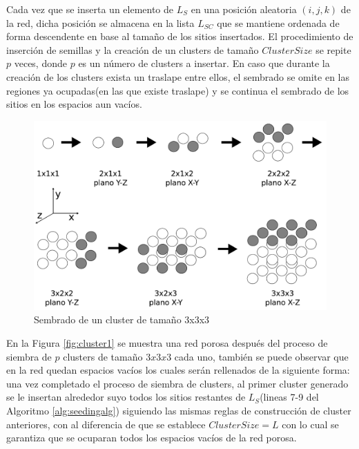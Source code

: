 Cada vez que se inserta un elemento de $L_S$ en una posición aleatoria $(i,j,k)$ de la red, dicha posición se almacena en la lista $L_{SC}$ que se mantiene ordenada de forma descendente en base al tamaño de los sitios insertados. El procedimiento de inserción de semillas y la creación de un clusters de tamaño $ClusterSize$ se repite $p$ veces, donde $p$ es un número de clusters a insertar. En caso que durante la creación de los clusters exista un traslape entre ellos, el sembrado se omite en las regiones ya ocupadas(en las que existe traslape) y se continua el sembrado de los sitios en los espacios aun vacíos.\\

\begin{figure}[hbtp]
\centering
\includegraphics[width=5.0in]{img/cluster_es.pdf}
\caption{Sembrado de un cluster de tamaño 3x3x3}
\label{fig:cluster}
\end{figure}

En la Figura \ref{fig:cluster1} se muestra una red porosa después del proceso de siembra de $p$ clusters de tamaño $3x3x3$ cada uno, también se puede observar que en la red quedan espacios vacíos  los cuales serán rellenados de la siguiente forma: una vez completado el proceso de siembra de clusters, al primer cluster generado se le insertan alrededor suyo todos los sitios restantes de $L_S$(lineas 7-9 del Algoritmo \ref{alg:seedingalg}) siguiendo las mismas reglas de construcción de cluster anteriores, con al diferencia de que se establece $ClusterSize=L$ con lo cual se garantiza que se ocuparan todos los espacios vacíos de la red porosa.\\

